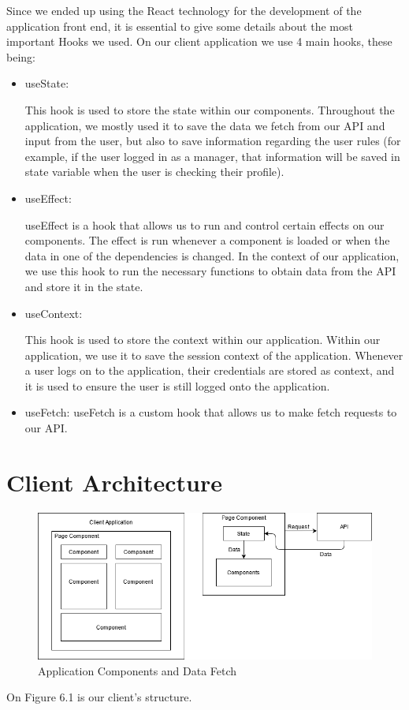 \documentclass[a4paper,twoside,10pt]{report}
\begin{document}
Since we ended up using the React technology for the development of the application front end, it is essential to give some details about the most important Hooks we used.
\newline
On our client application we use 4 main hooks, these being:
\newpage
 \begin{itemize}
	\item useState\cite{USESTATE}:

This hook is used to store the state within our components. Throughout the application, we mostly used it to save the data we fetch from our API and input from the user, but also to save information regarding the user rules (for example, if the user logged in as a manager, that information will be saved in state variable when the user is checking their profile).
	\item useEffect\cite{USEEFFECT}:

useEffect is a hook that allows us to run and control certain effects on our components. The effect is run whenever a component is loaded or when the data in one of the dependencies is changed. In the context of our application, we use this hook to run the necessary functions to obtain data from the API and store it in the state.
	\item useContext\cite{USECONTEXT}:

This hook is used to store the context within our application. Within our application, we use it to save the session context of the application. Whenever a user logs on to the application, their credentials are stored as context, and it is used to ensure the user is still logged onto the application.
	\item useFetch\cite{USEFETCH}: useFetch is a custom hook that allows us to make fetch requests to our API.
\end{itemize}

\section{Client Architecture}
\begin{figure}[h!]
\center
  \includegraphics[width=\textwidth]{client app architecture.png}
\caption{Application Components and Data Fetch}
\end{figure}
On Figure 6.1 is our client's structure. 
\end{document}
